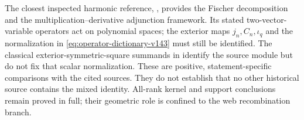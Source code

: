 The closest inspected harmonic reference,
\cite[\S1, equations (1)--(3); Definition 6.1 and Lemma 6.2]{DeBieEelbodeRoels},
provides the Fischer decomposition and the multiplication--derivative
adjunction framework.  Its stated two-vector-variable operators act
on polynomial spaces; the exterior maps \(j_n,C_n,\iota_q\)
and the normalization in \eqref{eq:operator-dictionary-v143} must
still be identified.  The classical exterior-symmetric-square
summands in \cite[\S2, Theorem 3.5]{ChengWang} identify the source
module but do not fix that scalar normalization.  These are positive,
statement-specific comparisons with the cited sources.  They do not
establish that no other historical source contains the mixed identity.
All-rank kernel and support conclusions remain proved in full; their
geometric role is confined to the web recombination branch.

